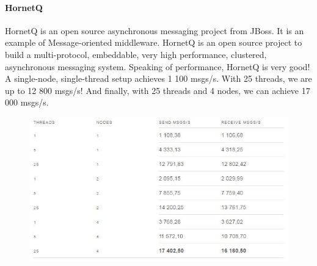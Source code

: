 \paragraph{HornetQ}
\label{sec:sec01}
HornetQ is an open source asynchronous messaging project from JBoss. 
It is an example of Message-oriented middleware.
 HornetQ is an open source project to build a multi-protocol, embeddable, very high performance, clustered,
  asynchronous messaging system.
Speaking of performance, HornetQ is very good! A single-node, 
single-thread setup achieves 1 100 msgs/s. 
With 25 threads, we are up to 12 800 msgs/s! And finally, with 25 threads and 4 nodes, we can achieve 17 000 msgs/s.
 \begin{figure}[h!]
	\centering
	\includegraphics[height=0.3\textheight]{fig01/HornetQ}
	\label{fig:FilialesEtClients}
\end{figure}
